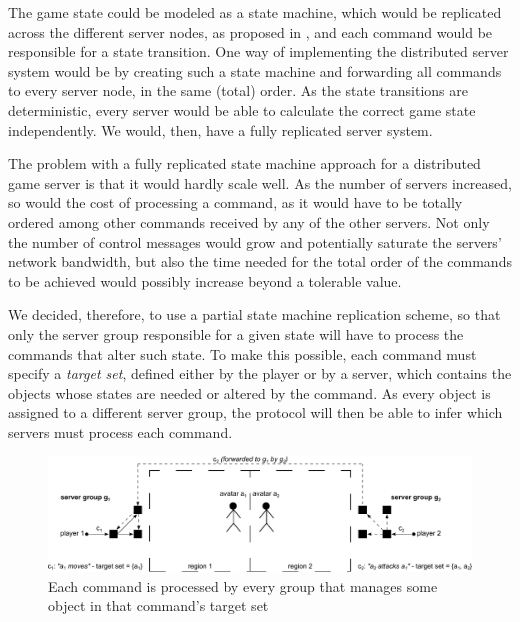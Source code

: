 \documentclass[]{usiinfprospectus}
\begin{document}
The game state could be modeled as a state machine, which would be replicated across the different server nodes, as proposed in \cite{lamport1978ird,schneider1990ift,lampson1996hbh}, and each command would be responsible for a state transition. One way of implementing the distributed server system would be by creating such a state machine and forwarding all commands to every server node, in the same (total) order. As the state transitions are deterministic, every server would be able to calculate the correct game state independently. %
We would, then, have a fully replicated server system.

The problem with a fully replicated state machine approach for a distributed game server is that it would hardly scale well. As the number of servers increased, so would the cost of processing a command, as it would have to be totally ordered among other commands received by any of the other servers. Not only the number of control messages would grow and potentially saturate the servers' network bandwidth, but also the time needed for the total order of the commands to be achieved would possibly increase beyond a tolerable value.

We decided, therefore, to use a partial state machine replication scheme, so that only the server group responsible for a given state will have to process the commands that alter such state. To make this possible, each command must specify a \emph{target set}, defined either by the player or by a server, which contains the objects whose states are needed or altered by the command. As every object is assigned to a different server group, the protocol will then be able to infer which servers must process each command.

\begin{figure}[!h]
  \centering
  \includegraphics[width=0.8\linewidth]{images/consistency}
  \caption{Each command is processed by every group that manages some object in that command's target set}
  \label{fig:consistency}
\end{figure}
\end{document}
